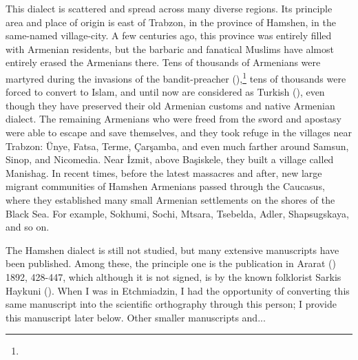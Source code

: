 This dialect is scattered and spread across many diverse regions. Its principle area and place of origin is east of Trabzon, in the province of Hamshen, in the same-named village-city. A few centuries ago, this province was entirely filled with Armenian residents, but the barbaric and fanatical Muslims have almost entirely erased the Armenians there. Tens of thousands of Armenians were martyred during the invasions of the bandit-preacher  (),\footnote{} tens of thousands were forced to convert to Islam, and until now are considered as Turkish (), even though they have preserved their old Armenian customs and native Armenian dialect. The remaining Armenians who were freed from the sword and apostasy were able to escape and save themselves, and they took refuge in the villages near Trabzon: Ünye, Fatsa, Terme, Çarşamba, and even much farther around Samsun, Sinop, and Nicomedia. Near İzmit, above Başiskele, they built a village called Manishag. In recent times, before the latest massacres and after, new large migrant communities of Hamshen Armenians passed through the Caucasus, where they established many small Armenian settlements on the shores of the Black Sea. For example, Sokhumi, Sochi, Mtsara, Tsebelda, Adler, Shapsugskaya, and so on. 


The Hamshen dialect is still not studied, but many extensive manuscripts have been published. Among these, the principle one is the publication in Ararat () 1892,  428-447, which although it is not signed, is by the known folklorist Sarkis Haykuni (). When I was in Etchmiadzin, I had the opportunity of converting this same manuscript into the scientific orthography through this person; I provide   this manuscript later below. Other smaller manuscripts and... 



\begin{adjarianpage}\label{page:185}\end{adjarianpage}%

